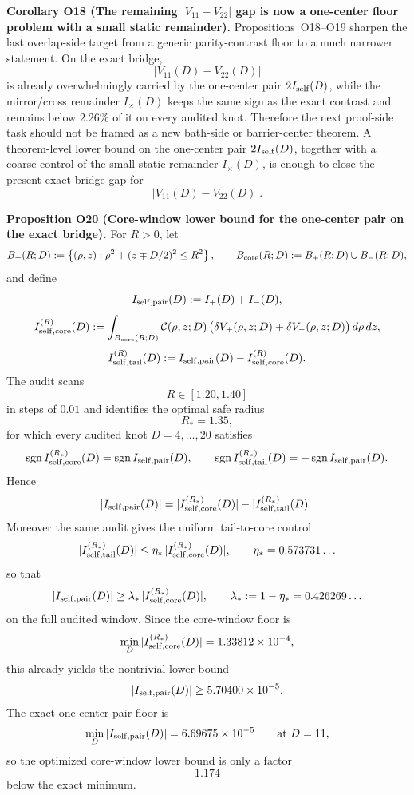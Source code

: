 \documentclass[aps,prd,onecolumn,notitlepage,nofootinbib,superscriptaddress,11pt,floatfix]{revtex4-2}
\begin{document}
\medskip\noindent\textbf{Corollary O18 (The remaining \texorpdfstring{$|V_{11}-V_{22}|$}{|V11-V22|} gap is now a one-center floor problem with a small static remainder).}
Propositions~O18--O19 sharpen the last overlap-side target from a generic parity-contrast floor to a much narrower statement.  On the exact bridge,
\[
|V_{11}(D)-V_{22}(D)|
\]
is already overwhelmingly carried by the one-center pair \(2I_{\rm self}(D)\), while the mirror/cross remainder \(I_\times(D)\) keeps the same sign as the exact contrast and remains below \(2.26\%\) of it on every audited knot.  Therefore the next proof-side task should not be framed as a new bath-side or barrier-center theorem.  A theorem-level lower bound on the one-center pair \(2I_{\rm self}(D)\), together with a coarse control of the small static remainder \(I_\times(D)\), is enough to close the present exact-bridge gap for
\[
|V_{11}(D)-V_{22}(D)|.
\]

\medskip\noindent\textbf{Proposition O20 (Core-window lower bound for the one-center pair on the exact bridge).}
For \(R>0\), let
\[
B_\pm(R;D):=\left\{(\rho,z):\rho^2+(z\mp D/2)^2\le R^2\right\},
\qquad
B_{\rm core}(R;D):=B_+(R;D)\cup B_-(R;D),
\]
and define
\[
I_{\rm self,pair}(D):=I_+(D)+I_-(D),
\]
\[
I_{\rm self,core}^{(R)}(D)
:=
\int_{B_{\rm core}(R;D)}
\mathcal C(\rho,z;D)\,
\bigl(\delta V_+(\rho,z;D)+\delta V_-(\rho,z;D)\bigr)\,d\rho\,dz,
\]
\[
I_{\rm self,tail}^{(R)}(D)
:=
I_{\rm self,pair}(D)-I_{\rm self,core}^{(R)}(D).
\]
The audit  scans
\[
R\in[1.20,1.40]
\]
in steps of \(0.01\) and identifies the optimal safe radius
\[
R_\ast=1.35,
\]
for which every audited knot \(D=4,\dots,20\) satisfies
\[
\operatorname{sgn} I_{\rm self,core}^{(R_\ast)}(D)
=
\operatorname{sgn} I_{\rm self,pair}(D),
\qquad
\operatorname{sgn} I_{\rm self,tail}^{(R_\ast)}(D)
=
-\operatorname{sgn} I_{\rm self,pair}(D).
\]
Hence
\[
|I_{\rm self,pair}(D)|
=
|I_{\rm self,core}^{(R_\ast)}(D)|
-|I_{\rm self,tail}^{(R_\ast)}(D)|.
\]
Moreover the same audit gives the uniform tail-to-core control
\[
|I_{\rm self,tail}^{(R_\ast)}(D)|
\le
\eta_\ast\,|I_{\rm self,core}^{(R_\ast)}(D)|,
\qquad
\eta_\ast=0.573731\ldots
\]
so that
\[
|I_{\rm self,pair}(D)|
\ge
\lambda_\ast\,|I_{\rm self,core}^{(R_\ast)}(D)|,
\qquad
\lambda_\ast:=1-\eta_\ast=0.426269\ldots
\]
on the full audited window. Since the core-window floor is
\[
\min_D |I_{\rm self,core}^{(R_\ast)}(D)|
=
1.33812\times10^{-4},
\]
this already yields the nontrivial lower bound
\[
|I_{\rm self,pair}(D)|
\ge
5.70400\times10^{-5}.
\]
The exact one-center-pair floor is
\[
\min_D |I_{\rm self,pair}(D)|
=
6.69675\times10^{-5}
\qquad\text{at }D=11,
\]
so the optimized core-window lower bound is only a factor
\[
1.174
\]
below the exact minimum.
\end{document}
